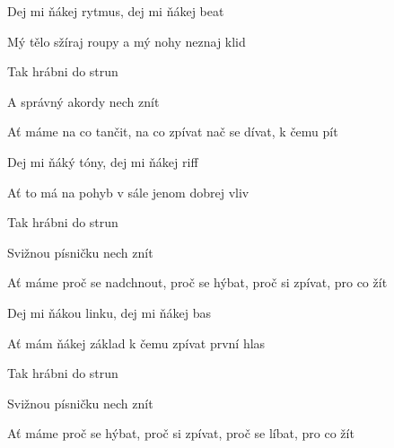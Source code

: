 

\zs
Dej mi ňákej rytmus, dej mi ňákej beat

Mý tělo sžíraj roupy a mý nohy neznaj klid

Tak hrábni do strun

A správný akordy nech znít

Ať máme na co tančit, na co zpívat nač se dívat, k čemu pít
\ks

\zs
Dej mi ňáký tóny, dej mi ňákej riff

Ať to má na pohyb v sále jenom dobrej vliv

Tak hrábni do strun

Svižnou písničku nech znít

Ať máme proč se nadchnout, proč se hýbat, proč si zpívat, pro co žít
\ks

\zs
Dej mi ňákou linku, dej mi ňákej bas

Ať mám ňákej základ k čemu zpívat první hlas

Tak hrábni do strun

Svižnou písničku nech znít

Ať máme proč se hýbat, proč si zpívat, proč se líbat, pro co žít
\ks

\kp
